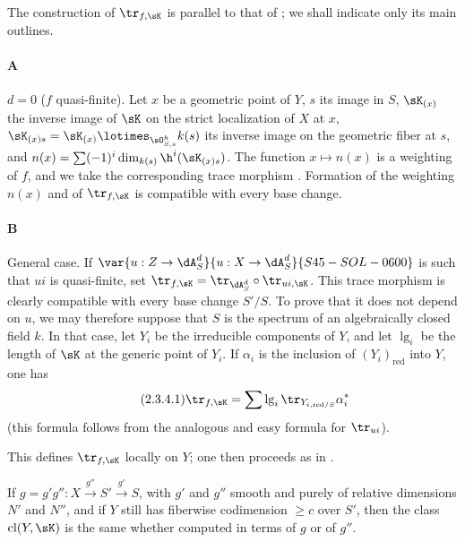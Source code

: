 \subsubsection{}\label{IV:2-3-4}

The construction of $\tr_{f,\sK}$ is parallel to that of
; we shall indicate only its main outlines.

\paragraph{A}
$d=0$ ($f$ quasi-finite). Let $x$ be a geometric point of $Y$, $s$ its image
in $S$, $\sK_{(x)}$ the inverse image of $\sK$ on the strict localization of
$X$ at $x$, $\sK_{(x)s} = \sK_{(x)}\lotimes_{\sO_{S,s}^h} k(s)$ its inverse
image on the geometric fiber at $s$, and
$n(x)=\sum (-1)^i \dim_{k(s)} \h^i(\sK_{(x)s})$. The function
$x\mapsto n(x)$ is a weighting of $f$, and we take the corresponding trace
morphism \cite[XVII.6.2.5]{sga4}. Formation of the weighting $n(x)$ and of
$\tr_{f,\sK}$ is compatible with every base change.

\paragraph{B}
General case. If $\var{u:Z\to \dA_S^d}{u:X\to \dA_S^d}{S45-SOL-0600}$ is such that $u i$ is quasi-finite, set
$\tr_{f,\sK} = \tr_{\dA_S^d}\circ \tr_{u i,\sK}$. This trace morphism is
clearly compatible with every base change $S'/S$. To prove that it does not
depend on $u$, we may therefore suppose that $S$ is the spectrum of an
algebraically closed field $k$. In that case, let $Y_i$ be the irreducible
components of $Y$, and let $\operatorname{lg}_i$ be the length of $\sK$ at
the generic point of $Y_i$. If $\alpha_i$ is the inclusion of
$(Y_i)_\text{red}$ into $Y$, one has
\begin{equation*}\tag{2.3.4.1}\label{IV:eq:2-3-4}
  \tr_{f,\sK} = \sum \operatorname{lg}_i \tr_{Y_{i,\text{red}/S}} \alpha_i^\ast
\end{equation*}
(this formula follows from the analogous and easy formula for $\tr_{u i}$).

This defines $\tr_{f,\sK}$ locally on $Y$; one then proceeds as in
\cite[XVIII.2.9]{sga4}.






\begin{lemma}\label{IV:2-3-5}
If $g=g'g'':X\xrightarrow{g''} S'\xrightarrow{g'} S$, with $g'$ and $g''$
smooth and purely of relative dimensions $N'$ and $N''$, and if $Y$ still
has fiberwise codimension $\geqslant c$ over $S'$, then the class
$\operatorname{cl}(Y,\sK)$ is the same whether computed in terms of $g$ or
of $g''$.
\end{lemma}

